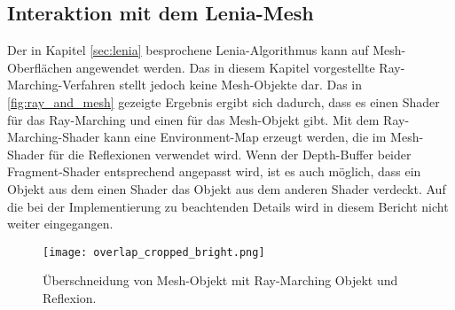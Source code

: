 \subsection{Interaktion mit dem Lenia-Mesh}
Der in Kapitel \ref{sec:lenia} besprochene Lenia-Algorithmus kann auf Mesh-Oberflächen angewendet werden.
Das in diesem Kapitel vorgestellte Ray-Marching-Verfahren stellt jedoch keine Mesh-Objekte dar.
Das in \autoref{fig:ray_and_mesh} gezeigte Ergebnis ergibt sich dadurch, dass es einen Shader für das Ray-Marching und einen für das Mesh-Objekt gibt.
Mit dem Ray-Marching-Shader kann eine Environment-Map erzeugt werden, die im Mesh-Shader für die Reflexionen verwendet wird.
Wenn der Depth-Buffer beider Fragment-Shader entsprechend angepasst wird, ist es auch möglich, dass ein Objekt aus dem einen Shader das Objekt aus dem anderen Shader verdeckt.
Auf die bei der Implementierung zu beachtenden Details wird in diesem Bericht nicht weiter eingegangen.

\begin{figure}[!htbp]\centering
    \texttt{[image: overlap\_cropped\_bright.png]}
    \caption{Überschneidung von Mesh-Objekt mit Ray-Marching Objekt und Reflexion.}
    \label{fig:ray_and_mesh}
\end{figure}

